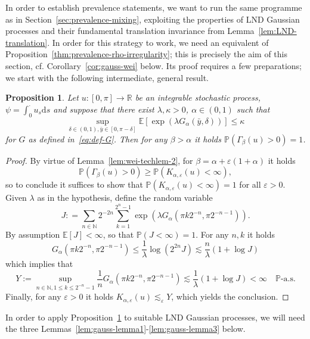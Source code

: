 \documentclass[11pt,oneside,reqno]{amsart}
\newcommand{\assign}{:=}
\newcommand{\mathd}{\mathrm{d}}
\newtheorem{proposition}[theorem]{Proposition}
{\theoremstyle{remark}\newtheorem{remark}[theorem]{Remark}}
\numberwithin{equation}{section}
\begin{document}
In order to establish prevalence statements, we want to run the
same programme as in Section~\ref{sec:prevalence-mixing}, exploiting the
properties of LND Gaussian processes and their fundamental translation
invariance from Lemma~\ref{lem:LND-translation}. In order for this strategy to
work, we need an equivalent of
Proposition~\ref{thm:prevalence-rho-irregularity}; this is precisely the aim
of this section, cf. Corollary~\ref{cor:gauss-wei} below. Its proof requires a
few preparations; we start with the following intermediate, general result.

\begin{proposition}
  \label{prop:sufficient-stochastic}Let $u : [0, \pi] \rightarrow \mathbb{R}$
  be an integrable stochastic process, $\psi = \int_0^{\cdot} u_s \mathd s$
  and suppose that there exist $\lambda, \kappa > 0$, $\alpha \in (0, 1)$ such
  that
  \[ \sup_{\delta \in (0, 1), \bar{y} \in [0, \pi - \delta]} \mathbb{E} [\exp
     (\lambda G_{\alpha} (\bar{y}, \delta))] \leqslant \kappa \]
  for $G$ as defined in~\eqref{eq:def-G}. Then for any $\beta > \alpha$ it
  holds $\mathbb{P} (\Gamma_{\beta} (u) > 0) = 1$.
\end{proposition}

\begin{proof}
  By virtue of Lemma~\ref{lem:wei-techlem-2}, for $\beta = \alpha +
  \varepsilon (1 + \alpha)$ it holds
  \[ \mathbb{P} (\Gamma_{\beta} (u) > 0) \geqslant \mathbb{P} (K_{\alpha,
     \varepsilon} (u) < \infty), \]
  so to conclude it suffices to show that $\mathbb{P} (K_{\alpha, \varepsilon}
  (u) < \infty) = 1$ for all $\varepsilon > 0$. Given $\lambda$ as in the
  hypothesis, define the random variable
  \[ J : = \sum_{n \in \mathbb{N}} 2^{- 2 n} \sum_{k = 1}^{2^n - 1} \exp
     (\lambda G_{\alpha} (\pi k 2^{- n}, \pi 2^{- n - 1})) . \]
  By assumption $\mathbb{E} [J] < \infty$, so that $\mathbb{P} (J < \infty) =
  1$. For any $n, k$ it holds
  \[ G_{\alpha} (\pi k 2^{- n}, \pi 2^{- n - 1}) \leqslant \frac{1}{\lambda}
     \log (2^{2 n} J) \lesssim \frac{n}{\lambda}  (1 + \log J) \]
  which implies that
  \[ Y \assign \sup_{n \in \mathbb{N}, 1 \leqslant k \leqslant 2^{- n} - 1}
     \frac{1}{n} G_{\alpha} (\pi k 2^{- n}, \pi 2^{- n - 1}) \lesssim
     \frac{1}{\lambda} (1 + \log J) < \infty \quad \mathbb{P} \text{-a.s.} \]
  Finally, for any $\varepsilon > 0$ it holds $K_{\alpha, \varepsilon} (u)
  \lesssim_{\varepsilon} Y$, which yields the conclusion.
\end{proof}

In order to apply Proposition~\ref{prop:sufficient-stochastic}
to suitable LND Gaussian processes, we will need the three
Lemmas~\ref{lem:gauss-lemma1}-\ref{lem:gauss-lemma3} below.
\end{document}
